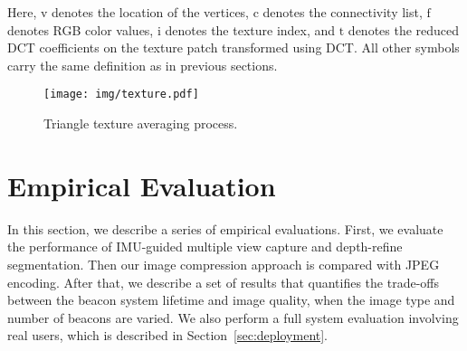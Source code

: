Here, $\mathrm{v}$ denotes the location of the vertices, $\mathrm{c}$ denotes the connectivity list, $\mathrm{f}$ denotes RGB color values, $\mathrm{i}$ denotes the texture index, and $\mathrm{t}$ denotes the reduced DCT coefficients on the texture patch transformed using DCT. All other symbols carry the same definition as in previous sections.

\begin{figure}[!thb]
    \begin{center}
	    \texttt{[image: img/texture.pdf]}
	    \caption{\footnotesize Triangle texture averaging process.}
	    \label{fig:texture}
    \end{center}
\end{figure}

\section{Empirical Evaluation}
\label{sec:eval}

In this section, we describe a series of empirical evaluations. First, we evaluate the performance of IMU-guided multiple view capture and depth-refine segmentation. Then our image compression approach is compared with JPEG encoding. After that, we describe a set of results that quantifies the trade-offs between the beacon system lifetime and image quality, when the image type and number of beacons are varied. We also perform a full system evaluation involving real users, which is described in Section~\ref{sec:deployment}.



